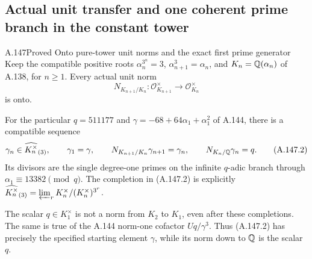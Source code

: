 \subsection{Actual unit transfer and one coherent prime branch in the constant tower}

\begin{statement}{A.147}{Proved}
{Onto pure-tower unit norms and the exact first prime generator}
Keep the compatible positive roots
\(\alpha_n^{3^n}=3\), \(\alpha_{n+1}^3=\alpha_n\), and
\(K_n=\mathbb Q(\alpha_n)\) of A.138, for \(n\geq1\).
Every actual unit norm
\[
 N_{K_{n+1}/K_n}:\mathcal O_{K_{n+1}}^\times
                         \longrightarrow\mathcal O_{K_n}^\times
\tag{A.147.1}
\]
is onto.

For the particular \(q=511177\) and
\(\gamma=-68+64\alpha_1+\alpha_1^2\) of A.144,
there is a compatible sequence
\[
 \gamma_n\in\widehat{K_n^\times}_{(3)},\qquad
 \gamma_1=\gamma,\qquad
 N_{K_{n+1}/K_n}\gamma_{n+1}=\gamma_n,\qquad
 N_{K_n/\mathbb Q}\gamma_n=q.
\tag{A.147.2}
\]
Its divisors are the single degree-one primes on the
infinite \(q\)-adic branch through
\(\alpha_1\equiv13382\pmod q\).
The completion in (A.147.2) is explicitly
\(\widehat{K_n^\times}_{(3)}=\varprojlim_r
K_n^\times/(K_n^\times)^{3^r}\).

The scalar \(q\in K_1^\times\) is not a norm from
\(K_2\) to \(K_1\), even after these completions.
The same is true of the A.144 norm-one cofactor
\(Uq/\gamma^3\).
Thus (A.147.2) has precisely the specified starting
element \(\gamma\), while its norm down to \(\mathbb Q\)
is the scalar \(q\).
\end{statement}
